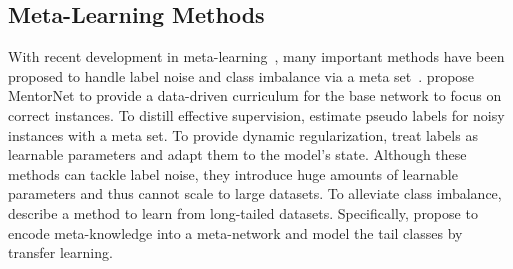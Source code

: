\subsection{Meta-Learning Methods}
%
With recent development in meta-learning~\cite{lakeHumanlevelConceptLearning2015a,franceschiBilevelProgrammingHyperparameter2018a,liuDARTSDifferentiableArchitecture2018}, many important methods have been proposed to handle label noise and class imbalance via a meta set~\cite{wangLearningModelTail2017,jiangMentorNetLearningDataDriven2018a,renLearningReweightExamples2018,liLearningLearnNoisy2019a,shuMetaWeightNetLearningExplicit2019a,huLearningDataManipulation2019a,wangOptimizingDataUsage2020b,alganMetaSoftLabel2021a}.
%
\cite{jiangMentorNetLearningDataDriven2018a} propose MentorNet to provide a data-driven curriculum for the base network to focus on correct instances.
%
To distill effective supervision, \cite{zhangDistillingEffectiveSupervision2020a} estimate pseudo labels for noisy instances with a meta set.
%
To provide dynamic regularization, \cite{vyasLearningSoftLabels2020b,alganMetaSoftLabel2021a} treat labels as learnable parameters and adapt them to the model’s state.
%
Although these methods can tackle label noise, they introduce huge amounts of learnable parameters and thus cannot scale to large datasets.
%
To alleviate class imbalance, \cite{wangLearningModelTail2017} describe a method to learn from long-tailed datasets.
%
Specifically, \cite{wangLearningModelTail2017} propose to encode meta-knowledge into a meta-network and model the tail classes by transfer learning. 
 
